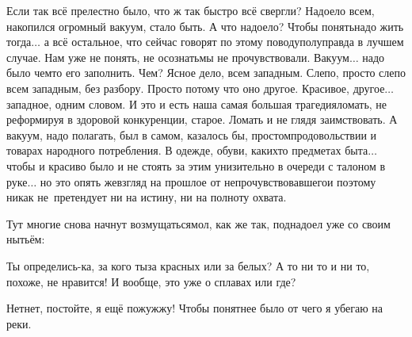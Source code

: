 Если так всё прелестно было, что ж так быстро всё свергли? Надоело всем, накопился огромный вакуум, стало быть. А что надоело? Чтобы понять\mdash надо жить тогда$\ldots$ а всё остальное, что сейчас говорят по этому поводу\mdash полуправда в лучшем случае. Нам уже не понять, не осознать\mdash мы не прочувствовали. Вакуум$\ldots$ надо было чем\sdash то его заполнить. Чем? Ясное дело, всем западным. Слепо, просто слепо всем западным, без разбору. Просто потому что оно другое. Красивое, другое$\ldots$ западное, одним словом. И это и есть наша самая большая трагедия\mdash ломать, не реформируя в здоровой конкуренции, старое. Ломать и не глядя заимствовать. А вакуум, надо полагать, был в самом, казалось бы, простом\mdash продовольствии и товарах народного потребления. В одежде, обуви, каких\sdash то предметах быта$\ldots$ чтобы и красиво было и не стоять за этим унизительно в очереди с талоном в руке$\ldots$ но это опять же\mdash взгляд на прошлое от непрочувствовавшего\mdash и поэтому никак не~претендует ни на истину, ни на полноту охвата.

Тут многие снова начнут возмущаться\mdash мол, как же так, поднадоел уже со своим нытьём:

\diagdash Ты определись-ка, за кого ты\mdash за красных или за белых? А то ни то и ни то, похоже, не нравится! И вообще, это уже о сплавах или где? 

\diagdash Нет\sdash нет, постойте, я ещё пожужжу! Чтобы понятнее было от чего я убегаю на реки. %


